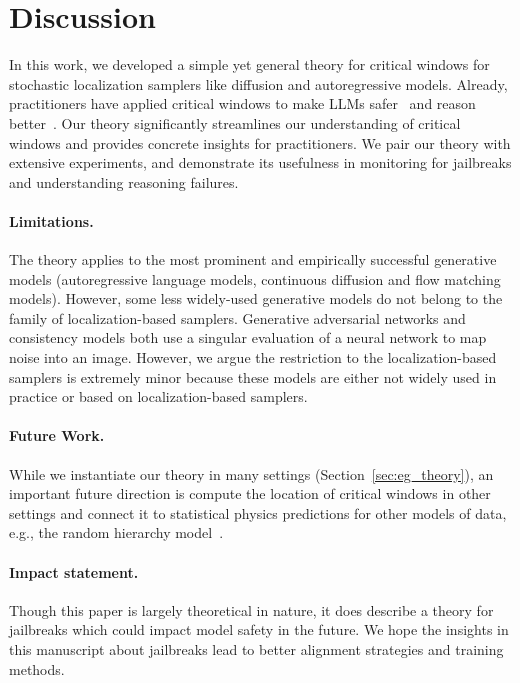 \section{Discussion}\label{sec:discussion}
In this work, we developed a simple yet general theory for critical windows for stochastic localization samplers like diffusion and autoregressive models. Already, practitioners have applied critical windows to make LLMs  safer~\citep{qi2024safetyalignmentjusttokens} and reason better~\citep{abdin2024phi4technicalreport,lin2024criticaltokensmattertokenlevel}. Our theory significantly streamlines our understanding of critical windows and provides concrete insights for practitioners. We pair our theory with extensive experiments, and demonstrate its usefulness in monitoring for jailbreaks and understanding reasoning failures.

\paragraph{Limitations.} The theory applies to the most prominent and empirically successful generative models (autoregressive language models, continuous diffusion and flow matching models). However, some less widely-used generative models do not belong to the family of localization-based samplers. Generative adversarial networks \citep{goodfellow2014generativeadversarialnetworks} and consistency models \citep{song2023consistencymodels} both use a singular evaluation of a neural network to map noise into an image. However, we argue the restriction to the localization-based samplers is extremely minor because these models are either not widely used in practice or based on localization-based samplers. 

\paragraph{Future Work.} While we instantiate our theory in many settings (Section~\ref{sec:eg_theory}), an important future direction is compute the location of critical windows in other settings and connect it to statistical physics predictions for other models of data, e.g., the random hierarchy model~\citep{sclocchi2024probinglatenthierarchicalstructure}. 

\paragraph{Impact statement.} Though this paper is largely theoretical in nature, it does describe a theory for jailbreaks which could impact model safety in the future. We hope the insights in this manuscript about jailbreaks lead to better alignment strategies and training methods. 


